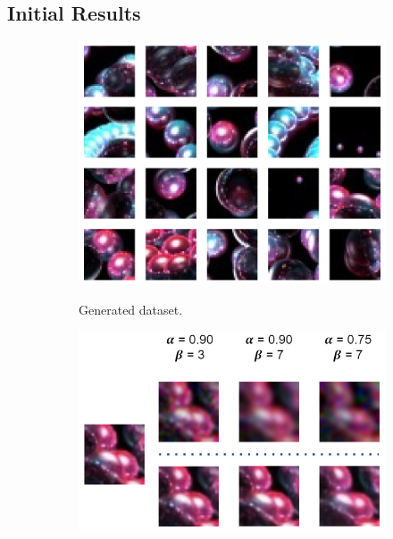 \documentclass{article}
\begin{document}
\subsection{Initial Results}
\label{subsec:initial}

\begin{figure}[h!]
\centering
\begin{subfigure}{0.375\textwidth}
\begin{center}
\begin{minipage}[t]{0.95\linewidth}
\begin{centering}
{\includegraphics[width=\linewidth]{srgan_frame_samples.png}}
\caption{Generated dataset.}
\label{fig:frame_dataset}
\end{centering}
\end{minipage}
\end{center}
\end{subfigure}
\begin{subfigure}{0.45\textwidth}
\begin{center}
\begin{minipage}[t]{0.95\linewidth}
\begin{centering}
{\includegraphics[width=\linewidth]{srgan_frame_outputs.png}}

\end{centering}
\end{minipage}
\end{center}
\end{subfigure}
\end{figure}
\end{document}
